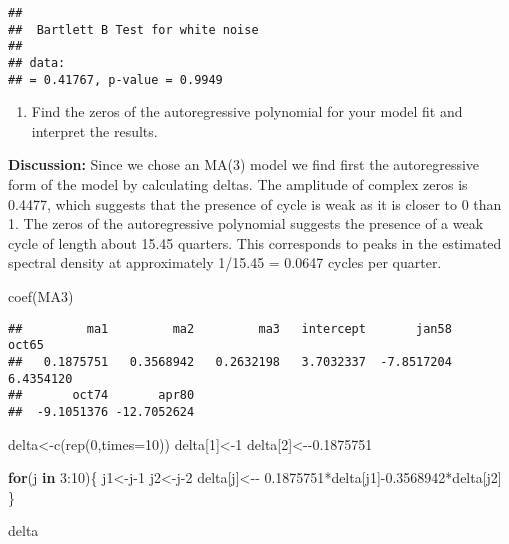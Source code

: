 \documentclass[
]{article}
\newenvironment{Shaded}{\begin{snugshade}}{\end{snugshade}}
\newcommand{\AttributeTok}[1]{\textcolor[rgb]{0.77,0.63,0.00}{#1}}
\newcommand{\ControlFlowTok}[1]{\textcolor[rgb]{0.13,0.29,0.53}{\textbf{#1}}}
\newcommand{\DecValTok}[1]{\textcolor[rgb]{0.00,0.00,0.81}{#1}}
\newcommand{\FloatTok}[1]{\textcolor[rgb]{0.00,0.00,0.81}{#1}}
\newcommand{\FunctionTok}[1]{\textcolor[rgb]{0.00,0.00,0.00}{#1}}
\newcommand{\NormalTok}[1]{#1}
\newcommand{\OtherTok}[1]{\textcolor[rgb]{0.56,0.35,0.01}{#1}}
\newcommand{\SpecialCharTok}[1]{\textcolor[rgb]{0.00,0.00,0.00}{#1}}
\providecommand{\tightlist}{%
  \setlength{\itemsep}{0pt}\setlength{\parskip}{0pt}}
\begin{document}
\begin{verbatim}
## 
##  Bartlett B Test for white noise
## 
## data:  
## = 0.41767, p-value = 0.9949
\end{verbatim}

\begin{enumerate}
\def\labelenumi{(\alph{enumi})}
\setcounter{enumi}{21}
\tightlist
\item
  Find the zeros of the autoregressive polynomial for your model fit and
  interpret the results.
\end{enumerate}

\textbf{Discussion:} Since we chose an MA(3) model we find first the
autoregressive form of the model by calculating deltas. The amplitude of
complex zeros is 0.4477, which suggests that the presence of cycle is
weak as it is closer to 0 than 1. The zeros of the autoregressive
polynomial suggests the presence of a weak cycle of length about 15.45
quarters. This corresponds to peaks in the estimated spectral density at
approximately 1/15.45 = 0.0647 cycles per quarter.

\begin{Shaded}
\begin{Highlighting}[]
\FunctionTok{coef}\NormalTok{(MA3)}
\end{Highlighting}
\end{Shaded}

\begin{verbatim}
##         ma1         ma2         ma3   intercept       jan58       oct65 
##   0.1875751   0.3568942   0.2632198   3.7032337  -7.8517204   6.4354120 
##       oct74       apr80 
##  -9.1051376 -12.7052624
\end{verbatim}

\begin{Shaded}
\begin{Highlighting}[]
\NormalTok{delta}\OtherTok{\textless{}{-}}\FunctionTok{c}\NormalTok{(}\FunctionTok{rep}\NormalTok{(}\DecValTok{0}\NormalTok{,}\AttributeTok{times=}\DecValTok{10}\NormalTok{))}
\NormalTok{delta[}\DecValTok{1}\NormalTok{]}\OtherTok{\textless{}{-}}\DecValTok{1}
\NormalTok{delta[}\DecValTok{2}\NormalTok{]}\OtherTok{\textless{}{-}}\SpecialCharTok{{-}}\FloatTok{0.1875751}

\ControlFlowTok{for}\NormalTok{(j }\ControlFlowTok{in} \DecValTok{3}\SpecialCharTok{:}\DecValTok{10}\NormalTok{)\{}
\NormalTok{j1}\OtherTok{\textless{}{-}}\NormalTok{j}\DecValTok{{-}1}
\NormalTok{j2}\OtherTok{\textless{}{-}}\NormalTok{j}\DecValTok{{-}2}
\NormalTok{delta[j]}\OtherTok{\textless{}{-}}\SpecialCharTok{{-}} \FloatTok{0.1875751}\SpecialCharTok{*}\NormalTok{delta[j1]}\SpecialCharTok{{-}}\FloatTok{0.3568942}\SpecialCharTok{*}\NormalTok{delta[j2]}
\NormalTok{\}}

\NormalTok{delta}
\end{Highlighting}
\end{Shaded}
\end{document}
